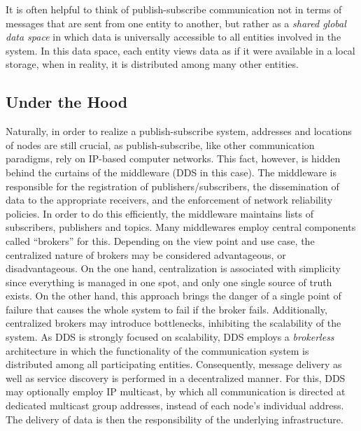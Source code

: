 It is often helpful to think of publish-subscribe communication not in terms of messages that are sent from one entity to another, but rather as a \emph{shared global data space} in which data is universally accessible to all entities involved in the system. In this data space, each entity views data as if it were available in a local storage, when in reality, it is distributed among many other entities.

\subsection{Under the Hood}
Naturally, in order to realize a publish-subscribe system, addresses and locations of nodes are still crucial, as publish-subscribe, like other communication paradigms, rely on IP-based computer networks. This fact, however, is hidden behind the curtains of the middleware (DDS in this case). The middleware is responsible for the registration of publishers/subscribers, the dissemination of data to the appropriate receivers, and the enforcement of network reliability policies. In order to do this efficiently, the middleware maintains lists of subscribers, publishers and topics. Many middlewares employ central components called ``brokers'' for this. Depending on the view point and use case, the centralized nature of brokers may be considered advantageous, or disadvantageous. On the one hand, centralization is associated with simplicity since everything is managed in one spot, and only one single source of truth exists. On the other hand, this approach brings the danger of a single point of failure that causes the whole system to fail if the broker fails. Additionally, centralized brokers may introduce bottlenecks, inhibiting the scalability of the system. As DDS is strongly focused on scalability, DDS employs a \emph{brokerless} architecture in which the functionality of the communication system is distributed among all participating entities. Consequently, message delivery as well as service discovery is performed in a decentralized manner. 
For this, DDS may optionally employ IP multicast, by which all communication is directed at dedicated multicast group addresses, instead of each node's individual address. The delivery of data is then the responsibility of the underlying infrastructure.

